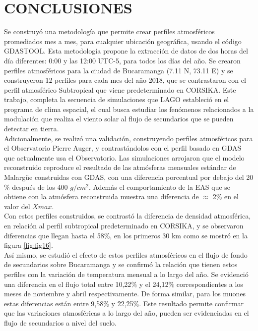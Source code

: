 \newpage
\chapter{CONCLUSIONES}


Se construyó una metodología que permite crear perfiles atmosféricos promediados mes a mes, para cualquier ubicación geográfica, usando el código GDASTOOL. Esta metodología propone la extracción de datos de dos horas del día diferentes: 0:00 y las 12:00 UTC-5, para todos los días del año. Se crearon perfiles atmosféricos para la ciudad de Bucaramanga (7.11 N, 73.11 E) y se construyeron 12 perfiles para cada mes del año 2018, que se contrastaron con el perfil atmosférico Subtropical que viene predeterminado en CORSIKA. Este trabajo, completa la secuencia de simulaciones que LAGO estableció en el programa de clima espacial, el cual busca estudiar los fenómenos relacionados a la  modulación que realiza el viento solar al flujo de secundarios que se pueden detectar en tierra.\\

Adicionalmente, se realizó una validación, construyendo perfiles atmosféricos para el Observatorio Pierre Auger, y contrastándolos con el perfil basado en GDAS que actualmente usa el Observatorio. Las simulaciones arrojaron que el modelo reconstruido reproduce el resultado de las atmósferas mensuales estándar de Malarg\"ue construidas con GDAS, con una diferencia porcentual por debajo del 20$\%$ después de los 400 $g/cm^{2}$. Además el comportamiento de la EAS que se obtiene con la atmósfera reconstruida muestra una diferencia de $\approx$ 2$\%$ en el valor del $X{max}$.\\

Con estos perfiles construidos, se contrastó la diferencia de  densidad atmosférica, en relación al perfil subtropical predeterminado en CORSIKA, y se observaron diferencias que llegan hasta el 58$\%$, en los primeros 30 km como se mostró en la figura \ref{fig:fig16}.\\

Así mismo, se estudió el efecto de estos perfiles atmosféricos en el flujo de fondo de secundarios sobre Bucaramanga y se confirmó la relación que tienen estos perfiles con la variación de temperatura mensual a lo largo del año. Se evidenció una diferencia en el flujo total entre 10,22$\%$ y el 24,12$\%$ correspondientes a los meses de noviembre y abril respectivamente. De forma similar, para los muones estas diferencias están entre 9,58$\%$ y 22,25$\%$. Este resultado permite confirmar que las variaciones atmosféricas a lo largo del año, pueden ser evidenciadas en el flujo de secundarios a nivel del suelo.\\

